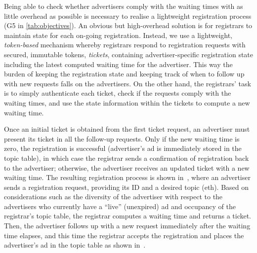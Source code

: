 Being able to check whether advertisers comply with the waiting times with as little overhead as possible is necessary to realise a lightweight registration process (G5 in \cref{tab:objectives}).  
An obvious but high-overhead solution is for registrars to maintain state for each on-going registration. %
Instead, we use a lightweight, \textit{token-based} mechanism whereby registrars respond to registration requests with secured, immutable tokens, \ie \textit{tickets}, containing advertiser-specific registration state including the latest computed waiting time for the advertiser. This way the burden of keeping the registration state and keeping track of when to follow up with new requests falls on the advertisers. On the other hand, the registrars' task is to simply authenticate each ticket, check if the requests comply with the waiting times, and use the state information within the tickets to compute a new waiting time.  



Once an initial ticket is obtained from the first ticket request, an advertiser must present its ticket in all the follow-up requests. Only if the new waiting time is zero, the registration is successful (\ie advertiser's ad is immediately stored in the topic table), in which case the registrar sends a confirmation of registration back to the advertiser; otherwise, the advertiser receives an updated ticket with a new waiting time. The resulting registration process is shown in~, where an advertiser sends a registration request, providing its ID and a desired topic (eth). Based on considerations such as the diversity of the advertiser with respect to the advertisers who currently have a ``live'' (\ie unexpired) ad and occupancy of the registrar's topic table, the registrar computes a waiting time and returns a ticket. Then, the advertiser follows up with a new request immediately after the waiting time elapses, and this time the registrar accepts the registration and places the advertiser's ad in the topic table as shown in~.

